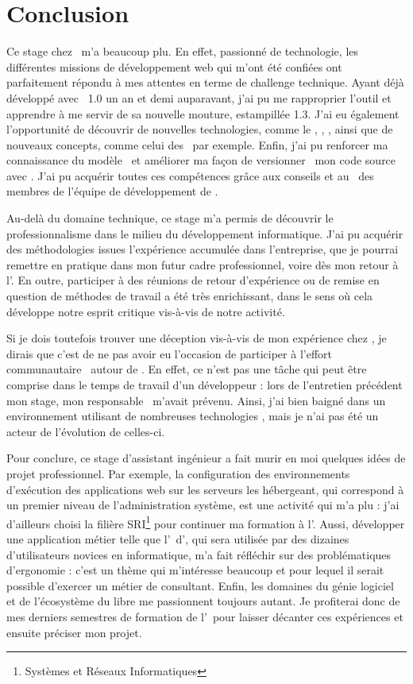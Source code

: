 \chapter{Conclusion}

Ce stage chez \asl\ m'a beaucoup plu. En effet, passionné de technologie, les différentes missions de développement web qui m'ont été confiées ont parfaitement répondu à mes attentes en terme de challenge technique. Ayant déjà développé avec \asf~1.0 un an et demi auparavant, j'ai pu me rapproprier l'outil et apprendre à me servir de sa nouvelle mouture, estampillée 1.3. J'ai eu également l'opportunité de découvrir de nouvelles technologies, comme le \ajs, \ajquery, \aajax, ainsi que de nouveaux concepts, comme celui des \awss\ par exemple. Enfin, j'ai pu renforcer ma connaissance du modèle \amvc\ et améliorer ma façon de \og versionner \fg\ mon code source avec \asvn. J'ai pu acquérir toutes ces compétences grâce aux conseils et au \acoaching\ des membres de l'équipe de développement de \asl.

Au-delà du domaine technique, ce stage m'a permis de découvrir le professionnalisme dans le milieu du développement informatique. J'ai pu acquérir des méthodologies issues l'expérience accumulée dans l'entreprise, que je pourrai remettre en pratique dans mon futur cadre professionnel, voire dès mon retour à l'\autc. En outre, participer à des réunions de retour d'expérience ou de remise en question de méthodes de travail a été très enrichissant, dans le sens où cela développe notre esprit critique vis-à-vis de notre activité.

Si je dois toutefois trouver une déception vis-à-vis de mon expérience chez \asl, je dirais que c'est de ne pas avoir eu l'occasion de participer à l'effort communautaire \aos\ autour de \asf. En effet, ce n'est pas une tâche qui peut être comprise dans le temps de travail d'un développeur : lors de l'entretien précédent mon stage, mon responsable \ahugon\ m'avait prévenu. Ainsi, j'ai bien baigné dans un environnement utilisant de nombreuses technologies \aos, mais je n'ai pas été un acteur de l'évolution de celles-ci.

Pour conclure, ce stage d'assistant ingénieur a fait murir en moi quelques idées de projet professionnel. Par exemple, la configuration des environnements d'exécution des applications web sur les serveurs les hébergeant, qui correspond à un premier niveau de l'administration système, est une activité qui m'a plu : j'ai d'ailleurs choisi la filière SRI\footnote{Systèmes et Réseaux Informatiques} pour continuer ma formation à l'\autc. Aussi, développer une application métier telle que l'\aintranet\ d'\aey, qui sera utilisée par des dizaines d'utilisateurs novices en informatique, m'a fait réfléchir sur des problématiques d'ergonomie : c'est un thème qui m'intéresse beaucoup et pour lequel il serait possible d'exercer un métier de consultant. Enfin, les domaines du génie logiciel et de l'écosystème du libre me passionnent toujours autant. Je profiterai donc de mes derniers semestres de formation de l'\autc\ pour laisser décanter ces expériences et ensuite préciser mon projet.
